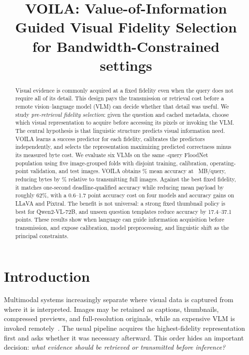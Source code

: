\documentclass[10pt,conference]{IEEEtran}
\title{VOILA: Value-of-Information Guided Visual Fidelity Selection for Bandwidth-Constrained settings}
\author{\IEEEauthorblockN{Anonymous Authors}}
\newcommand{\system}{\textsc{VOILA}\xspace}
\begin{document}
\maketitle

\begin{abstract}
Visual evidence is commonly acquired at a fixed fidelity even when the query
does not require all of its detail. This design pays the transmission or
retrieval cost before a remote vision--language model (VLM) can decide whether
that detail was useful. We study \emph{pre-retrieval fidelity selection}: given
the question and cached metadata, choose which visual representation to acquire
before accessing its pixels or invoking the VLM. The central hypothesis is
that linguistic structure predicts visual information need. \system learns a
success predictor for each fidelity, calibrates the predictors independently,
and selects the representation maximizing predicted correctness minus its
measured byte cost. We evaluate six VLMs on the same \PopulationSize-query
FloodNet population using five image-grouped folds with disjoint training,
calibration, operating-point validation, and test images. \system obtains
\MeanVoilaAccuracy\% mean accuracy at \MeanVoilaMB\ MB/query, reducing bytes by
\MeanByteReduction\% relative to transmitting full images. Against the best
fixed fidelity, it matches one-second deadline-qualified accuracy while reducing
mean payload by roughly 62\%, with a 0.6--1.7 point accuracy cost on four models
and accuracy gains on LLaVA and Pixtral. The benefit is not universal: a strong
fixed thumbnail policy is best for Qwen2-VL-72B, and unseen question templates
reduce accuracy by 17.4--37.1 points. These results show when language can guide
information acquisition before transmission, and expose calibration, model
preprocessing, and linguistic shift as the principal constraints.
\end{abstract}

\section{Introduction}
\label{sec:introduction}

Multimodal systems increasingly separate where visual data is captured from
where it is interpreted. Images may be retained as captions, thumbnails,
compressed previews, and full-resolution originals, while an expensive VLM is
invoked remotely~\cite{alayrac2022flamingo,li2023blip2,liu2024visual,bai2023qwen}.
The usual pipeline acquires the highest-fidelity representation first and asks
whether it was necessary afterward. This order hides an important decision:
\emph{what evidence should be retrieved or transmitted before inference?}
\end{document}

